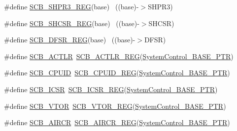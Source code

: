 \begin{DoxyCompactItemize}
\item 
\#define \hyperlink{group___s_c_b___register___accessor___macros_ga8c93949e94df4ece6b4fafd94cca708d}{S\+C\+B\+\_\+\+S\+H\+P\+R3\+\_\+\+R\+EG}(base)                                        ~((base)-\/$>$S\+H\+P\+R3)
\item 
\#define \hyperlink{group___s_c_b___register___accessor___macros_ga84042bf531b908ba8afa2bb260acfdb1}{S\+C\+B\+\_\+\+S\+H\+C\+S\+R\+\_\+\+R\+EG}(base)                                        ~((base)-\/$>$S\+H\+C\+SR)
\item 
\#define \hyperlink{group___s_c_b___register___accessor___macros_ga2ac45bf07176acb69b71189cddba46dc}{S\+C\+B\+\_\+\+D\+F\+S\+R\+\_\+\+R\+EG}(base)                                          ~((base)-\/$>$D\+F\+SR)
\item 
\#define \hyperlink{group___s_c_b___register___accessor___macros_ga2a94c61032c2b326d148f402585f66f4}{S\+C\+B\+\_\+\+A\+C\+T\+LR}~\hyperlink{group___s_c_b___register___accessor___macros_gacc7b0065f69b9a0d772af30505d9d5e8}{S\+C\+B\+\_\+\+A\+C\+T\+L\+R\+\_\+\+R\+EG}(\hyperlink{group___s_c_b___peripheral_gaf22864785770f832103e904244e078cb}{System\+Control\+\_\+\+B\+A\+S\+E\+\_\+\+P\+TR})
\item 
\#define \hyperlink{group___s_c_b___register___accessor___macros_gad6f841a4188701c78b4fbefc4dcd1cb6}{S\+C\+B\+\_\+\+C\+P\+U\+ID}~\hyperlink{group___s_c_b___register___accessor___macros_ga0fafcf57528f45b4ef5f3c5bfa627d55}{S\+C\+B\+\_\+\+C\+P\+U\+I\+D\+\_\+\+R\+EG}(\hyperlink{group___s_c_b___peripheral_gaf22864785770f832103e904244e078cb}{System\+Control\+\_\+\+B\+A\+S\+E\+\_\+\+P\+TR})
\item 
\#define \hyperlink{group___s_c_b___register___accessor___macros_ga7f8564488243827944de74c4db24b732}{S\+C\+B\+\_\+\+I\+C\+SR}~\hyperlink{group___s_c_b___register___accessor___macros_ga32d507fb0a9ba80ad95e451fc93c942a}{S\+C\+B\+\_\+\+I\+C\+S\+R\+\_\+\+R\+EG}(\hyperlink{group___s_c_b___peripheral_gaf22864785770f832103e904244e078cb}{System\+Control\+\_\+\+B\+A\+S\+E\+\_\+\+P\+TR})
\item 
\#define \hyperlink{group___s_c_b___register___accessor___macros_ga4b62b78bccb6fe6afabe8f4969f58908}{S\+C\+B\+\_\+\+V\+T\+OR}~\hyperlink{group___s_c_b___register___accessor___macros_ga882585be47587da934194ffd169da43f}{S\+C\+B\+\_\+\+V\+T\+O\+R\+\_\+\+R\+EG}(\hyperlink{group___s_c_b___peripheral_gaf22864785770f832103e904244e078cb}{System\+Control\+\_\+\+B\+A\+S\+E\+\_\+\+P\+TR})
\item 
\#define \hyperlink{group___s_c_b___register___accessor___macros_gafb55c4d149b907fe569a1d8bb31cade1}{S\+C\+B\+\_\+\+A\+I\+R\+CR}~\hyperlink{group___s_c_b___register___accessor___macros_ga0510b76b89d5729f2ba9341356553f3e}{S\+C\+B\+\_\+\+A\+I\+R\+C\+R\+\_\+\+R\+EG}(\hyperlink{group___s_c_b___peripheral_gaf22864785770f832103e904244e078cb}{System\+Control\+\_\+\+B\+A\+S\+E\+\_\+\+P\+TR})

\end{DoxyCompactItemize}

